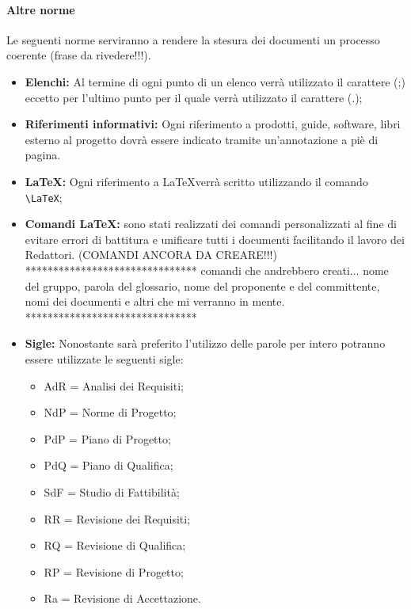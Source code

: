 \paragraph{Altre norme} 
Le seguenti norme serviranno a rendere la stesura dei documenti un processo coerente (frase da rivedere!!!).
\begin{itemize}
	\item \textbf{Elenchi:} Al termine di ogni punto di un elenco verrà utilizzato il carattere (;) eccetto per l'ultimo punto per il quale verrà utilizzato il carattere (.);
	\item \textbf{Riferimenti informativi:} Ogni riferimento a prodotti, guide, software,
	libri esterno al progetto dovrà essere indicato tramite un’annotazione a piè di
	pagina.
	\item \textbf{\LaTeX:} Ogni riferimento a \LaTeX verrà scritto utilizzando il comando \texttt{\textbackslash LaTeX};
	\item \textbf{Comandi \LaTeX:} sono stati realizzati dei comandi personalizzati al fine di evitare errori di battitura e unificare tutti i documenti facilitando il lavoro dei Redattori. (COMANDI ANCORA DA CREARE!!!)
	*******************************
	comandi che andrebbero creati... nome del gruppo, parola del glossario, nome del proponente e del committente, nomi dei documenti e altri che mi verranno in mente.
	*******************************
	\item \textbf{Sigle:} Nonostante sarà preferito l'utilizzo delle parole per intero potranno essere utilizzate le seguenti sigle:
	\begin{itemize}
	\item AdR = Analisi dei Requisiti;
	\item NdP = Norme di Progetto;
	\item PdP = Piano di Progetto;
	\item PdQ = Piano di Qualifica;
	\item SdF = Studio di Fattibilità;
	\item RR = Revisione dei Requisiti;
	\item RQ = Revisione di Qualifica;
	\item RP = Revisione di Progetto;
	\item Ra = Revisione di Accettazione.
	\end{itemize}
\end{itemize}
